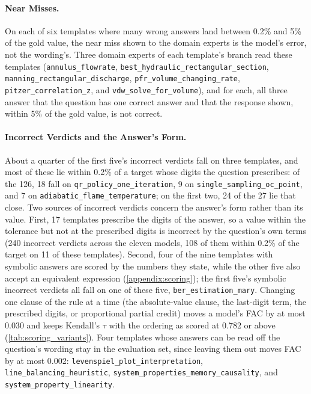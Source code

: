 \paragraph{Near Misses.} On each of six templates where many wrong answers land between 0.2\% and
5\% of the gold value, the near miss shown to the domain experts is the model's error, not the
wording's.
Three domain experts of each template's branch read these templates
(\texttt{annulus\_flowrate}, \texttt{best\_hydraulic\_rectangular\_section},
\texttt{manning\_rectangular\_discharge}, \texttt{pfr\_volume\_changing\_rate},
\texttt{pitzer\_correlation\_z}, and \texttt{vdw\_solve\_for\_volume}), and for each, all three
answer that the question has one correct answer and that the response shown, within 5\% of the
gold value, is not correct.

\paragraph{Incorrect Verdicts and the Answer's Form.} About a quarter of the first five's incorrect
verdicts fall on three templates, and most of these lie within 0.2\% of a target whose digits the
question prescribes: of the 126, 18 fall on \texttt{qr\_policy\_one\_iteration}, 9 on
\texttt{single\_sampling\_oc\_point}, and 7 on \texttt{adiabatic\_flame\_temperature}; on the first
two, 24 of the 27 lie that close.
Two sources of incorrect verdicts concern the answer's form rather than its value.
First, 17 templates prescribe the digits of the answer, so a value within the tolerance but not at
the prescribed digits is incorrect by the question's own terms (240 incorrect verdicts across the
eleven models, 108 of them within 0.2\% of the target on 11 of these templates).
Second, four of the nine templates with symbolic answers are scored by the numbers they state, while
the other five also accept an equivalent expression (\autoref{appendix:scoring}); the first five's
symbolic incorrect verdicts all fall on one of these five, \texttt{ber\_estimation\_mary}.
Changing one clause of the rule at a time (the absolute-value clause, the last-digit term, the
prescribed digits, or proportional partial credit) moves a model's FAC by at most 0.030 and keeps
Kendall's $\tau$ with the ordering as scored at 0.782 or above (\autoref{tab:scoring_variants}).
Four templates whose answers can be read off the question's wording stay in the evaluation set,
since leaving them out moves FAC by at most 0.002: \texttt{levenspiel\_plot\_interpretation},
\texttt{line\_balancing\_heuristic}, \texttt{system\_properties\_memory\_causality}, and
\texttt{system\_property\_linearity}.
